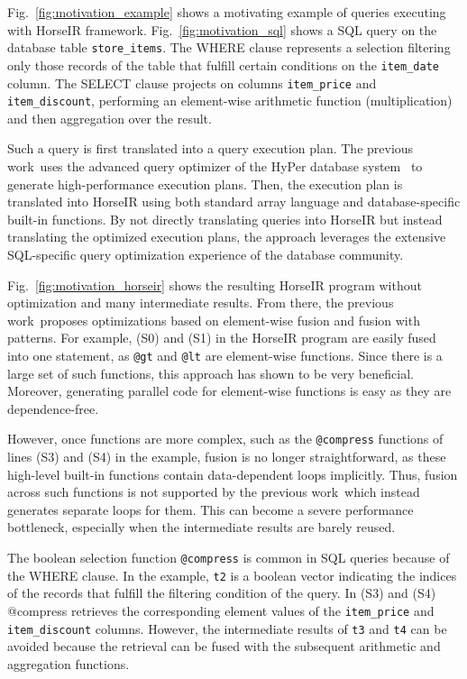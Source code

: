 

Fig.~\ref{fig:motivation_example} shows a motivating example of queries
executing with HorseIR framework. Fig.~\ref{fig:motivation_sql} shows a SQL
query on the database table \texttt{store\_items}. The WHERE clause represents
a selection filtering only those records of the table that fulfill certain
conditions on the \texttt{item_date} column. The SELECT clause projects on
columns \texttt{item_price} and \texttt{item\_discount}, performing an
element-wise arithmetic function (multiplication) and then aggregation over the
result. 

Such a query is first translated into a query execution plan. The previous
work~\OldPaper uses the advanced query optimizer of the HyPer database
system~\cite{Neumann2011:HyPer} to generate high-performance execution plans.
Then, the execution plan is translated into HorseIR using both standard array
language and database-specific built-in functions. By not directly translating
queries into HorseIR but instead translating the optimized execution plans, the
approach leverages the extensive SQL-specific query optimization experience of
the database community.

Fig.~\ref{fig:motivation_horseir} shows the resulting HorseIR program without
optimization and many intermediate results. From there, the previous
work~\OldPaper proposes optimizations based on element-wise fusion and fusion
with patterns. For example, (S0) and (S1) in the HorseIR program are easily
fused into one statement, as \texttt{@gt} and \texttt{@lt} are element-wise
functions. Since there is a large set of such functions, this approach has
shown to be very beneficial. 
Moreover, generating parallel code for element-wise functions is easy as they
are dependence-free.


However, once functions are more complex, such as the \texttt{@compress}
functions of lines (S3) and (S4) in the example, fusion is no longer
straightforward, as these high-level built-in functions contain data-dependent
loops implicitly. 
Thus, fusion across such functions is not supported by the previous
work~\OldPaper which instead generates separate loops for them.
This can become a severe performance bottleneck, especially when the
intermediate results are barely reused. 

The boolean selection function \texttt{@compress} is common in SQL queries
because of the WHERE clause.
In the example, \texttt{t2} is a boolean vector indicating the indices of the
records that fulfill the filtering condition of the query. In (S3) and (S4)
@compress retrieves the corresponding element values of the
\texttt{item\_price} and \texttt{item\_discount} columns.
However, the intermediate results of \texttt{t3} and \texttt{t4} can be avoided
because the retrieval can be fused with the subsequent arithmetic and
aggregation functions. 

